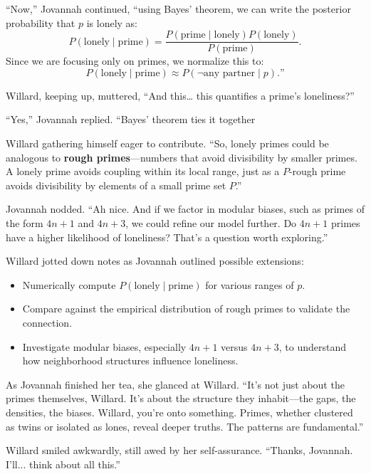 “Now,” Jovannah continued, “using Bayes’ theorem, we can write the posterior probability that \( p \) is lonely as:
\[
P(\text{lonely} \mid \text{prime}) = \frac{P(\text{prime} \mid \text{lonely}) P(\text{lonely})}{P(\text{prime})}.
\]
Since we are focusing only on primes, we normalize this to:
\[
P(\text{lonely} \mid \text{prime}) \approx P(\neg \text{any partner} \mid p).”
\]
\bigskip

Willard, keeping up, muttered, “And this… this quantifies a prime's loneliness?”
\bigskip

“Yes,” Jovannah replied. “Bayes’ theorem ties it together
\bigskip

Willard gathering himself eager to contribute. “So, lonely primes could be analogous to \textbf{rough primes}—numbers that avoid divisibility by smaller primes. A lonely prime avoids coupling within its local range, just as a \( P \)-rough prime avoids divisibility by elements of a small prime set \( P \).”
\bigskip

Jovannah nodded. “Ah nice. And if we factor in modular biases, such as primes of the form \( 4n+1 \) and \( 4n+3 \), we could refine our model further. Do \( 4n+1 \) primes have a higher likelihood of loneliness? That’s a question worth exploring.”

Willard jotted down notes as Jovannah outlined possible extensions:
\begin{itemize}
    \item Numerically compute \( P(\text{lonely} \mid \text{prime}) \) for various ranges of \( p \).
    \item Compare against the empirical distribution of rough primes to validate the connection.
    \item Investigate modular biases, especially \( 4n+1 \) versus \( 4n+3 \), to understand how neighborhood structures influence loneliness.
\end{itemize}

As Jovannah finished her tea, she glanced at Willard. “It’s not just about the primes themselves, Willard. It’s about the structure they inhabit—the gaps, the densities, the biases. Willard, you’re onto something. Primes, whether clustered as twins or isolated as lones, reveal deeper truths. The patterns are fundamental.”
\bigskip

Willard smiled awkwardly, still awed by her self-assurance. “Thanks, Jovannah. I’ll... think about all this.”
\bigskip

